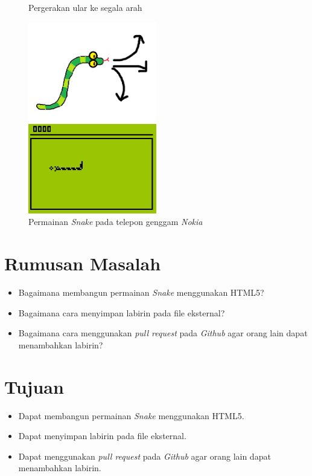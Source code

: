 \documentclass[a4paper,twoside]{article}
\begin{document}
\begin{figure}[H]
	\centering
	\begin{minipage}{.5\textwidth}
		\caption{Pergerakan ular ke segala arah}
		\centering
		\includegraphics[width=0.5\textwidth]{snake.png}
	\end{minipage}%
	\begin{minipage}{.5\textwidth}
		\caption{Permainan \textit{Snake} pada telepon genggam \textit{Nokia}}
		\centering
		\includegraphics[width=0.5\textwidth]{snake2.jpg}
	\end{minipage}
\end{figure}

\section{Rumusan Masalah}
\begin{itemize}
	\item Bagaimana membangun permainan \textit{Snake} menggunakan HTML5? 
	\item Bagaimana cara menyimpan labirin pada file eksternal?
	\item Bagaimana cara menggunakan \textit{pull request} pada \textit{Github} agar orang lain dapat menambahkan labirin?
\end{itemize}

\section{Tujuan}
\begin{itemize}
	\item Dapat membangun permainan \textit{Snake} menggunakan HTML5. 
	\item Dapat menyimpan labirin pada file eksternal.
	\item Dapat menggunakan \textit{pull request} pada \textit{Github} agar orang lain dapat menambahkan labirin.
\end{itemize}
\end{document}
